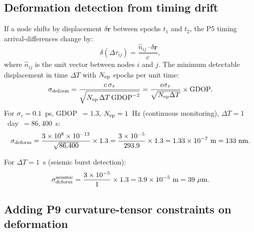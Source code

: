 \documentclass[aps,prd,twocolumn,superscriptaddress,nofootinbib,longbibliography]{revtex4-2}
\begin{document}
\subsection{Deformation detection from timing drift}

If a node shifts by displacement $\delta\mathbf{r}$ between epochs $t_1$ and
$t_2$, the P5 timing arrival-differences change by:
\begin{equation}
\delta(\Delta\tau_{ij}) = \frac{\hat{n}_{ij}\cdot\delta\mathbf{r}}{c},
\end{equation}
where $\hat{n}_{ij}$ is the unit vector between nodes $i$ and $j$.
The minimum detectable displacement in time $\Delta T$ with $N_{\rm ep}$
epochs per unit time:
\begin{equation}
\sigma_{\rm deform}
= \frac{c\,\sigma_\tau}{\sqrt{N_{\rm ep}\,\Delta T\,\mathrm{GDOP}^{-2}}}
= \frac{c\sigma_\tau}{\sqrt{N_{\rm ep}\Delta T}}\times\mathrm{GDOP}.
\end{equation}
For $\sigma_\tau = 0.1$~ps, GDOP~$= 1.3$, $N_{\rm ep} = 1$~Hz (continuous
monitoring), $\Delta T = 1$~day~$= 86{,}400$~s:
\begin{equation}
\sigma_{\rm deform} = \frac{3\times10^8\times10^{-13}}{\sqrt{86{,}400}}\times1.3
= \frac{3\times10^{-5}}{293.9}\times1.3 = 1.33\times10^{-7}\ \si{m} = 133\ \si{nm}.
\end{equation}

For $\Delta T = 1$~s (seismic burst detection):
\begin{equation}
\sigma_{\rm deform}^{\rm seismic}
= \frac{3\times10^{-5}}{1}\times1.3 = 3.9\times10^{-5}\ \si{m} = 39\ \mu\si{m}.
\end{equation}

\subsection{Adding P9 curvature-tensor constraints on deformation}
\end{document}
